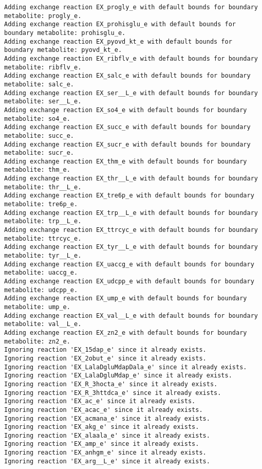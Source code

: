\documentclass[
  letterpaper,
  DIV=11,
  numbers=noendperiod]{scrartcl}
\begin{document}
\begin{verbatim}
Adding exchange reaction EX_progly_e with default bounds for boundary metabolite: progly_e.
Adding exchange reaction EX_prohisglu_e with default bounds for boundary metabolite: prohisglu_e.
Adding exchange reaction EX_pyovd_kt_e with default bounds for boundary metabolite: pyovd_kt_e.
Adding exchange reaction EX_ribflv_e with default bounds for boundary metabolite: ribflv_e.
Adding exchange reaction EX_salc_e with default bounds for boundary metabolite: salc_e.
Adding exchange reaction EX_ser__L_e with default bounds for boundary metabolite: ser__L_e.
Adding exchange reaction EX_so4_e with default bounds for boundary metabolite: so4_e.
Adding exchange reaction EX_succ_e with default bounds for boundary metabolite: succ_e.
Adding exchange reaction EX_sucr_e with default bounds for boundary metabolite: sucr_e.
Adding exchange reaction EX_thm_e with default bounds for boundary metabolite: thm_e.
Adding exchange reaction EX_thr__L_e with default bounds for boundary metabolite: thr__L_e.
Adding exchange reaction EX_tre6p_e with default bounds for boundary metabolite: tre6p_e.
Adding exchange reaction EX_trp__L_e with default bounds for boundary metabolite: trp__L_e.
Adding exchange reaction EX_ttrcyc_e with default bounds for boundary metabolite: ttrcyc_e.
Adding exchange reaction EX_tyr__L_e with default bounds for boundary metabolite: tyr__L_e.
Adding exchange reaction EX_uaccg_e with default bounds for boundary metabolite: uaccg_e.
Adding exchange reaction EX_udcpp_e with default bounds for boundary metabolite: udcpp_e.
Adding exchange reaction EX_ump_e with default bounds for boundary metabolite: ump_e.
Adding exchange reaction EX_val__L_e with default bounds for boundary metabolite: val__L_e.
Adding exchange reaction EX_zn2_e with default bounds for boundary metabolite: zn2_e.
Ignoring reaction 'EX_15dap_e' since it already exists.
Ignoring reaction 'EX_2obut_e' since it already exists.
Ignoring reaction 'EX_LalaDgluMdapDala_e' since it already exists.
Ignoring reaction 'EX_LalaDgluMdap_e' since it already exists.
Ignoring reaction 'EX_R_3hocta_e' since it already exists.
Ignoring reaction 'EX_R_3httdca_e' since it already exists.
Ignoring reaction 'EX_ac_e' since it already exists.
Ignoring reaction 'EX_acac_e' since it already exists.
Ignoring reaction 'EX_acmana_e' since it already exists.
Ignoring reaction 'EX_akg_e' since it already exists.
Ignoring reaction 'EX_alaala_e' since it already exists.
Ignoring reaction 'EX_amp_e' since it already exists.
Ignoring reaction 'EX_anhgm_e' since it already exists.
Ignoring reaction 'EX_arg__L_e' since it already exists.

\end{verbatim}
\end{document}
